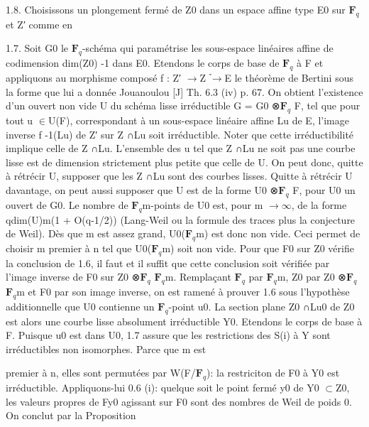 \documentclass[11pt]{article}
\begin{document}
1.8. Choisissons un plongement fermé de Z0 dans un espace affine type E0 sur \(\mathbf F_q\) et Z′ comme en 

1.7. Soit G0 le \(\mathbf F_q\)-schéma qui paramétrise les sous-espace linéaires affine de codimension dim(Z0) -1 dans E0. Etendons le corps de base de \(\mathbf F_q\) à F et appliquons au morphisme composé f : Z′ \(\to\)Z ֒\(\to\)E le théorème de Bertini sous la forme que lui a donnée Jouanoulou [J] Th. 6.3 (iv) p. 67. On obtient l’existence d’un ouvert non vide U du schéma lisse irréductible G = G0 ⊗\(\mathbf F_q\) F, tel que pour tout u \(\in\)U(F), correspondant à un sous-espace linéaire affine Lu de E, l’image inverse f -1(Lu) de Z′ sur Z ∩Lu soit irréductible. Noter que cette irréductibilité implique celle de Z ∩Lu. L’ensemble des u tel que Z ∩Lu ne soit pas une courbe lisse est de dimension strictement plus petite que celle de U. On peut donc, quitte à rétrécir U, supposer que les Z ∩Lu sont des courbes lisses. Quitte à rétrécir U davantage, on peut aussi supposer que U est de la forme U0 ⊗\(\mathbf F_q\) F, pour U0 un ouvert de G0. Le nombre de \(\mathbf F_q\)m-points de U0 est, pour m \(\to\)\(\infty\), de la forme qdim(U)m(1 + O(q-1/2)) (Lang-Weil ou la formule des traces plus la conjecture de Weil). Dès que m est assez grand, U0(\(\mathbf F_q\)m) est donc non vide. Ceci permet de choisir m premier à n tel que U0(\(\mathbf F_q\)m) soit non vide. Pour que F0 sur Z0 vérifie la conclusion de 1.6, il faut et il suffit que cette conclusion soit vérifiée par l’image inverse de F0 sur Z0 ⊗\(\mathbf F_q\) \(\mathbf F_q\)m. Remplaçant \(\mathbf F_q\) par \(\mathbf F_q\)m, Z0 par Z0 ⊗\(\mathbf F_q\) \(\mathbf F_q\)m et F0 par son image inverse, on est ramené à prouver 1.6 sous l’hypothèse additionnelle que U0 contienne un \(\mathbf F_q\)-point u0. La section plane Z0 ∩Lu0 de Z0 est alors une courbe lisse absolument irréductible Y0. Etendons le corps de base à F. Puisque u0 est dans U0, 1.7 assure que les restrictions des S(i) à Y sont irréductibles non isomorphes. Parce que m est

premier à n, elles sont permutées par W(F/\(\mathbf F_q\)): la restriciton de F0 à Y0 est irréductible. Appliquons-lui 0.6 (i): quelque soit le point fermé y0 de Y0 \(\subset\)Z0, les valeurs propres de Fy0 agissant sur F0 sont des nombres de Weil de poids 0. On conclut par la Proposition 
\end{document}

